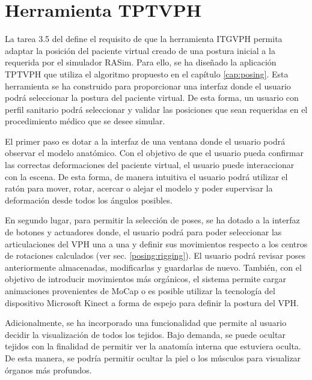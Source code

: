 \section{Herramienta \ac{TPTVPH}}
\label{rasim:posing}

La tarea 3.5 del  define el requisito de que la herramienta \ac{ITGVPH} permita adaptar la posición del paciente virtual creado de una postura inicial a la requerida por el simulador \ac{RASim}. Para ello, se ha diseñado la aplicación \ac{TPTVPH} que utiliza el algoritmo propuesto en el capítulo \ref{cap:posing}. Esta herramienta se ha construido para proporcionar una interfaz donde el usuario podrá seleccionar la postura del paciente virtual. De esta forma, un usuario con perfil sanitario podrá seleccionar y validar las posiciones que sean requeridas en el procedimiento médico que se desee simular.


El primer paso es dotar a la interfaz de una ventana donde el usuario podrá observar el modelo anatómico. Con el objetivo de que el usuario pueda confirmar las correctas deformaciones del paciente virtual, el usuario puede interaccionar con la escena. De esta forma, de manera intuitiva el usuario podrá utilizar el ratón para mover, rotar, acercar o alejar el modelo y poder supervisar la deformación desde todos los ángulos posibles.

En segundo lugar, para permitir la selección de poses, se ha dotado a la interfaz de botones y actuadores donde, el usuario podrá para poder seleccionar las articulaciones del \ac{VPH} una a una y definir sus movimientos respecto a los centros de rotaciones calculados (ver sec. \ref{posing:rigging}). El usuario podrá revisar poses anteriormente almacenadas, modificarlas y guardarlas de nuevo.  También, con el objetivo de introducir movimientos más orgánicos, el sistema permite cargar animaciones provenientes de \ac{MoCap} o es posible utilizar la tecnología del dispositivo Microsoft Kinect a forma de espejo para definir la postura del \ac{VPH}.

Adicionalmente, se ha incorporado una funcionalidad que permite al usuario decidir la visualización de todos los tejidos. Bajo demanda, se puede ocultar tejidos con la finalidad de permitir ver la anatomía interna que estuviera oculta. De esta manera, se podría permitir ocultar la piel o los músculos para visualizar órganos más profundos. 

